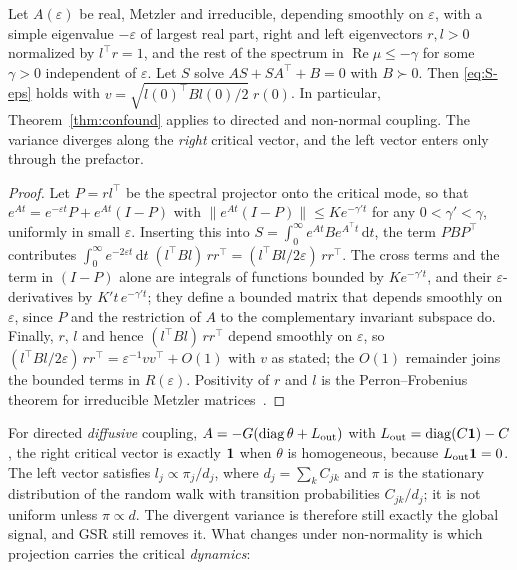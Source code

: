 \begin{corollary}\label{cor:nonnormal}
Let $A(\varepsilon)$ be real, Metzler and irreducible, depending smoothly on $\varepsilon$, with a simple
eigenvalue $-\varepsilon$ of largest real part, right and left eigenvectors $r,l>0$ normalized by
$l^\top r=1$, and the rest of the spectrum in $\operatorname{Re}\mu\le-\gamma$ for some $\gamma>0$
independent of $\varepsilon$. Let $S$ solve $AS+SA^\top+B=0$ with $B\succ0$. Then \eqref{eq:S-eps} holds with
$v=\sqrt{l(0)^\top Bl(0)/2}\;r(0)$. In particular, Theorem~\ref{thm:confound} applies to directed and non-normal
coupling. The variance diverges along the \emph{right} critical vector, and the left vector enters
only through the prefactor.
\end{corollary}

\begin{proof}
Let $P=rl^\top$ be the spectral projector onto the critical mode, so that $e^{At}=e^{-\varepsilon t}P+e^{At}(I-P)$ with $\|e^{At}(I-P)\|\le Ke^{-\gamma' t}$ for any $0<\gamma'<\gamma$, uniformly in small $\varepsilon$. Inserting this into $S=\int_0^\infty e^{At}Be^{A^\top t}\,\mathrm dt$, the term $PBP^\top$ contributes $\int_0^\infty e^{-2\varepsilon t}\,\mathrm dt\;(l^\top Bl)\,rr^\top=(l^\top Bl/2\varepsilon)\,rr^\top$. The cross terms and the term in $(I-P)$ alone are integrals of functions bounded by $Ke^{-\gamma' t}$, and their $\varepsilon$-derivatives by $K't\,e^{-\gamma' t}$; they define a bounded matrix that depends smoothly on $\varepsilon$, since $P$ and the restriction of $A$ to the complementary invariant subspace do. Finally, $r$, $l$ and hence $(l^\top Bl)\,rr^\top$ depend smoothly on $\varepsilon$, so $(l^\top Bl/2\varepsilon)\,rr^\top=\varepsilon^{-1}vv^\top+O(1)$ with $v$ as stated; the $O(1)$ remainder joins the bounded terms in $R(\varepsilon)$. Positivity of $r$ and $l$ is the Perron--Frobenius theorem for irreducible Metzler matrices~\cite{Berman1994}.
\end{proof}

For directed \emph{diffusive} coupling, $A=-G(\operatorname{diag}\theta+L_{\rm out})$ with
$L_{\rm out}=\operatorname{diag}(C\mathbf 1)-C$, the right critical vector is exactly $\mathbf 1$ when $\theta$ is homogeneous,
because $L_{\rm out}\mathbf 1=0$. The left vector satisfies $l_j\propto\pi_j/d_j$, where $d_j=\sum_kC_{jk}$ and $\pi$ is the stationary distribution of the random walk with transition probabilities $C_{jk}/d_j$; it is not uniform unless $\pi\propto d$. The divergent variance is therefore still exactly the global
signal, and GSR still removes it. What changes under non-normality is which projection carries the
critical \emph{dynamics}:

